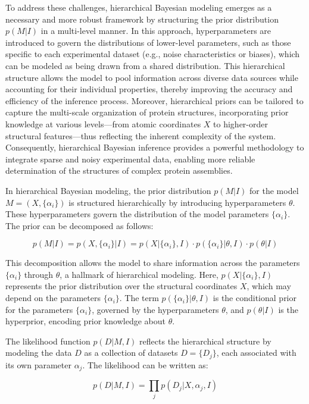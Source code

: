 \documentclass[pdflatex,sn-mathphys-num]{sn-jnl}%
\theoremstyle{thmstyleone}%
\theoremstyle{thmstyletwo}%
\theoremstyle{thmstylethree}%
\begin{document}
{To address these challenges, hierarchical Bayesian modeling emerges as a necessary and more robust framework by structuring the prior distribution $p(M|I)$ in a multi-level manner. In this approach, hyperparameters are introduced to govern the distributions of lower-level parameters, such as those specific to each experimental dataset (e.g., noise characteristics or biases), which can be modeled as being drawn from a shared distribution. This hierarchical structure allows the model to pool information across diverse data sources while accounting for their individual properties, thereby improving the accuracy and efficiency of the inference process. Moreover, hierarchical priors can be tailored to capture the multi-scale organization of protein structures, incorporating prior knowledge at various levels---from atomic coordinates $X$ to higher-order structural features---thus reflecting the inherent complexity of the system. Consequently, hierarchical Bayesian inference provides a powerful methodology to integrate sparse and noisy experimental data, enabling more reliable determination of the structures of complex protein assemblies.

In hierarchical Bayesian modeling, the prior distribution \( p(M|I) \) for the model \( M = (X, \{\alpha_i\}) \) is structured hierarchically by introducing hyperparameters \(\theta\). These hyperparameters govern the distribution of the model parameters \(\{\alpha_i\}\). The prior can be decomposed as follows:

\[
p(M|I) = p(X, \{\alpha_i\} | I) = p(X | \{\alpha_i\}, I) \cdot p(\{\alpha_i\} | \theta, I) \cdot p(\theta | I)
\]

This decomposition allows the model to share information across the parameters \(\{\alpha_i\}\) through \(\theta\), a hallmark of hierarchical modeling. Here, \( p(X | \{\alpha_i\}, I) \) represents the prior distribution over the structural coordinates \( X \), which may depend on the parameters \(\{\alpha_i\}\). The term \( p(\{\alpha_i\} | \theta, I) \) is the conditional prior for the parameters \(\{\alpha_i\}\), governed by the hyperparameters \(\theta\), and \( p(\theta | I) \) is the hyperprior, encoding prior knowledge about \(\theta\).

The likelihood function \( p(D | M, I) \) reflects the hierarchical structure by modeling the data \( D \) as a collection of datasets \( D = \{D_j\} \), each associated with its own parameter \(\alpha_j\). The likelihood can be written as:

\[
p(D | M, I) = \prod_j p(D_j | X, \alpha_j, I)
\]

}
\end{document}
